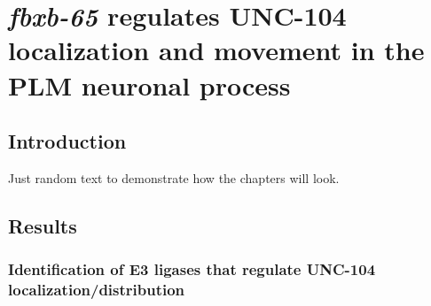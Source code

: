
\chapter{{\itshape fbxb-65} regulates UNC-104 localization and movement in the PLM neuronal process}

\section{Introduction}

Just random text to demonstrate how the chapters will look.
\blindtext {}


\section{Results}


\blindtext 


\subsection{Identification of E3 ligases that regulate UNC-104 localization/distribution}

\blindtext {}


%